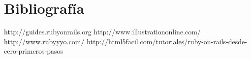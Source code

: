\newpage
\section{Bibliografía}

\begin{thebibliography}{99}
http://guides.rubyonrails.org
http://www.illustrationonline.com/
http://www.rubyyyo.com/
http://html5facil.com/tutoriales/ruby-on-rails-desde-cero-primeros-pasos
\end{thebibliography}
